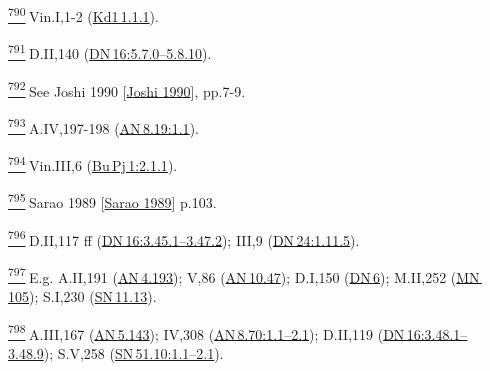 \label{footprints_split_025.html_fn790}
\hyperref[footprints_split_019.htmlux5cux23fnref790]{\textsuperscript{790}} Vin.I,1-2
(\href{https://suttacentral.net/pli-tv-kd1/en/brahmali\#1.1.1}{Kd1\,1.1.1}).

\label{footprints_split_025.html_fn791}
\hyperref[footprints_split_019.htmlux5cux23fnref791]{\textsuperscript{791}} D.II,140
(\href{https://suttacentral.net/dn16/en/sujato\#5.7.0}{DN\,16:5.7.0--5.8.10}).

\label{footprints_split_025.html_fn792}
\hyperref[footprints_split_019.htmlux5cux23fnref792]{\textsuperscript{792}} See
{Joshi 1990
{{[}\hyperref[footprints_split_022.htmlux5cux23Joshiux5cux25201990]{Joshi
1990}{]}}}, pp.7-9.

\label{footprints_split_025.html_fn793}
\hyperref[footprints_split_019.htmlux5cux23fnref793]{\textsuperscript{793}} A.IV,197-198
(\href{https://suttacentral.net/an8.19/en/sujato\#1.1}{AN\,8.19:1.1}).

\label{footprints_split_025.html_fn794}
\hyperref[footprints_split_019.htmlux5cux23fnref794]{\textsuperscript{794}} Vin.III,6
(\href{https://suttacentral.net/pli-tv-bu-vb-pj1/en/brahmali\#2.1.1}{Bu\,Pj\,1:2.1.1}).

\label{footprints_split_025.html_fn795}
\hyperref[footprints_split_019.htmlux5cux23fnref795]{\textsuperscript{795}} {Sarao
1989
{{[}\hyperref[footprints_split_022.htmlux5cux23Saraoux5cux25201989]{Sarao
1989}{]}}} p.103.

\label{footprints_split_025.html_fn796}
\hyperref[footprints_split_019.htmlux5cux23fnref796]{\textsuperscript{796}} D.II,117
ff
(\href{https://suttacentral.net/dn16/en/sujato\#3.45.1}{DN\,16:3.45.1--3.47.2});
III,9
(\href{https://suttacentral.net/dn24/en/sujato\#1.11.5}{DN\,24:1.11.5}).

\label{footprints_split_025.html_fn797}
\hyperref[footprints_split_019.htmlux5cux23fnref797]{\textsuperscript{797}} E.g.
A.II,191 (\href{https://suttacentral.net/an4.193/en/sujato}{AN\,4.193});
V,86 (\href{https://suttacentral.net/an10.47/en/sujato}{AN\,10.47});
D.I,150 (\href{https://suttacentral.net/dn6/en/sujato}{DN\,6}); M.II,252
(\href{https://suttacentral.net/mn105/en/sujato}{MN\,105}); S.I,230
(\href{https://suttacentral.net/sn11.13/en/sujato}{SN\,11.13}).

\label{footprints_split_025.html_fn798}
\hyperref[footprints_split_019.htmlux5cux23fnref798]{\textsuperscript{798}} A.III,167
(\href{https://suttacentral.net/an5.143/en/sujato}{AN\,5.143}); IV,308
(\href{https://suttacentral.net/an8.70/en/sujato\#1.1}{AN\,8.70:1.1--2.1});
D.II,119
(\href{https://suttacentral.net/dn16/en/sujato\#3.48.1}{DN\,16:3.48.1--3.48.9});
S.V,258
(\href{https://suttacentral.net/sn51.10/en/sujato\#1.1}{SN\,51.10:1.1--2.1}).

